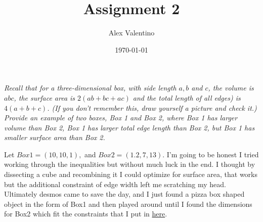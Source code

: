 \documentclass[12pt, letterpaper]{article}
\date{\today}
\author{Alex Valentino}
\title{Assignment 2}
\begin{document}
	\textit{Recall that for a three-dimensional box, with side length $a,b$ and $c$, the volume is $abc$, the
surface area is $2(ab + bc + ac)$ and the total length of all edges) is $4(a + b + c)$. (If you don't
remember this, draw yourself a picture and check it.) Provide an example of two boxes, Box
1 and Box 2, where Box 1 has larger volume than Box 2, Box 1 has larger total edge length
than Box 2, but Box 1 has smaller surface area than Box 2.}

Let $Box1 = (10,10,1),$ and $Box2 = (1.2,7,13).$  I'm going to be honest I tried working through the inequalities but without much luck in the end.  I thought by dissecting a cube and recombining it I could optimize for surface area, that works but the additional constraint of edge width left me scratching my head.  Ultimately desmos came to save the day, and I just found a pizza box shaped object in the form of Box1 and then played around until I found the dimensions for Box2 which fit the constraints that I put in \href{https://www.desmos.com/calculator/gdptj8hhbh}{here}.   
\end{document}
